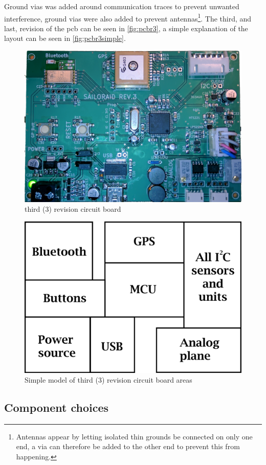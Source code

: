 Ground \gls{via}s was added around communication traces to prevent unwanted interference, ground \gls{via}s were also added to prevent antennas\footnote{Antennas appear by letting isolated thin grounds be connected on only one end, a \gls{via} can therefore be added to the other end to prevent this from happening.}.
The third, and last, revision of the \gls{pcb} can be seen in \autoref{fig:pcbr3}, a simple explanation of the layout can be seen in \autoref{fig:pcbr3simple}.
\begin{figure}[tb]
	\centering
    \includegraphics[width=\linewidth]{Figures/pcb_rev3.jpg}
	\caption{third (3) revision circuit board}
	\label{fig:pcbr3}
\end{figure}
\begin{figure}[tb]
	\centering
    \includegraphics[width=.75\linewidth]{Figures/pcb_rev3_simple.png}
	\caption{Simple model of third (3) revision circuit board areas}
	\label{fig:pcbr3simple}
\end{figure}

\subsection{Component choices}\label{sec:hw:tip1}



